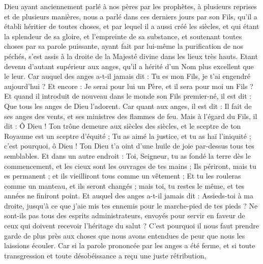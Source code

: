 \begin{multicols}{2}
\VerseOne{}Dieu ayant anciennement parlé à nos pères par les prophètes, à plusieurs reprises et de plusieurs manières,
nous a parlé dans ces derniers jours par son Fils, qu'il a établi héritier de toutes choses, et par lequel il a aussi créé les siècles,
et qui étant la splendeur de sa gloire, et l'empreinte de sa substance, et soutenant toutes choses par sa parole puissante, ayant fait par lui-même la purification de nos péchés, s'est assis à la droite de la Majesté divine dans les lieux très hauts.
Etant devenu d'autant supérieur aux anges, qu'il a hérité d’un Nom plus excellent que le leur.
Car auquel des anges a-t-il jamais dit : Tu es mon Fils, je t'ai engendré aujourd'hui ? Et encore : Je serai pour lui un Père, et il sera pour moi un Fils ?
Et quand il introduit de nouveau dans le monde son Fils premier-né, il est dit : Que tous les anges de Dieu l'adorent.
Car quant aux anges, il est dit : Il fait de ses anges des vents, et ses ministres des flammes de feu.
Mais à l’égard du Fils, il dit : Ô Dieu ! Ton trône demeure aux siècles des siècles, et le sceptre de ton Royaume est un sceptre d'équité ;
Tu as aimé la justice, et tu as haï l'iniquité ; c'est pourquoi, ô Dieu ! Ton Dieu t'a oint d'une huile de joie par-dessus tous tes semblables.
Et dans un autre endroit : Toi, Seigneur, tu as fondé la terre dès le commencement, et les cieux sont les ouvrages de tes mains ;
Ils périront, mais tu es permanent ; et ils vieilliront tous comme un vêtement ;
Et tu les rouleras comme un manteau, et ils seront changés ; mais toi, tu restes le même, et tes années ne finiront point.
Et auquel des anges a-t-il jamais dit : Assieds-toi à ma droite, jusqu’à ce que j’aie mis tes ennemis pour le marche-pied de tes pieds ?
Ne sont-ils pas tous des esprits administrateurs, envoyés pour servir en faveur de ceux qui doivent recevoir l'héritage du salut ?
\VerseOne{}C'est pourquoi il nous faut prendre garde de plus près aux choses que nous avons entendues de peur que nous les laissions écouler.
Car si la parole prononcée par les anges a été ferme, et si toute transgression et toute désobéissance a reçu une juste rétribution,

\end{multicols}
